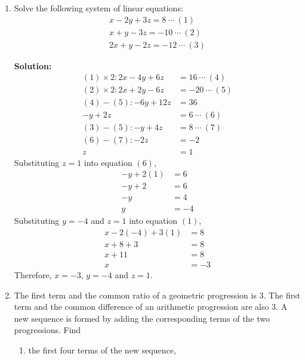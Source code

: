 \documentclass{report}
\newcommand{\sol}{\textbf{Solution:}}
\begin{document}
\begin{enumerate}[leftmargin=*]
    \item Solve the following system of linear equations: $$
              \begin{gathered}
                  x-2 y+3 z=8\ \cdots\ (1) \\
                  x+y-3 z=-10\ \cdots\ (2) \\
                  2 x+y-2 z=-12\ \cdots\ (3)
              \end{gathered}
          $$

          \sol{}
          \begin{align*}
              (1) \times 2: 2x-4y+6z & =16\ \cdots\ (4)  \\
              (2) \times 2: 2x+2y-6z & =-20\ \cdots\ (5) \\
              (4) - (5): -6y+12z     & =36               \\
              -y + 2z                & =6\ \cdots\ (6)   \\
              (3) - (5): -y+4z       & =8\ \cdots\ (7)   \\
              (6) - (7): -2z         & =-2               \\
              z                      & =1
          \end{align*}
          Substituting $z=1$ into equation $(6)$,
          \begin{align*}
              -y+2(1) & =6  \\
              -y+2    & =6  \\
              -y      & =4  \\
              y       & =-4
          \end{align*}
          Substituting $y=-4$ and $z=1$ into equation $(1)$,
          \begin{align*}
              x-2(-4)+3(1) & =8  \\
              x+8+3        & =8  \\
              x+11         & =8  \\
              x            & =-3
          \end{align*}
          Therefore, $x=-3$, $y=-4$ and $z=1$.

    \item The first term and the common ratio of a geometric progression is 3. The first
          term and the common difference of an arithmetic progression are also 3. A new
          sequence is formed by adding the corresponding terms of the two progressions.
          Find
          \begin{enumerate}
              \item the first four terms of the new sequence,


\end{enumerate}
\end{enumerate}
\end{document}
